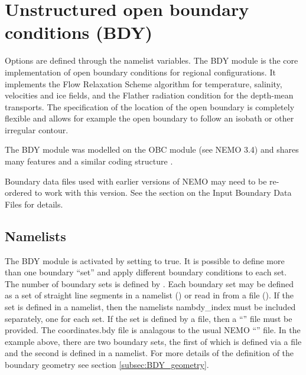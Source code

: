 \documentclass[../tex_main/NEMO_manual]{subfiles}
\begin{document}
\section{Unstructured open boundary conditions (BDY)}
\label{sec:LBC_bdy}




Options are defined through the   namelist variables.
The BDY module is the core implementation of open boundary conditions for regional configurations.
It implements the Flow Relaxation Scheme algorithm for temperature, salinity, velocities and ice fields, and
the Flather radiation condition for the depth-mean transports.
The specification of the location of the open boundary is completely flexible and
allows for example the open boundary to follow an isobath or other irregular contour. 

The BDY module was modelled on the OBC module (see NEMO 3.4) and shares many features and
a similar coding structure \citep{Chanut2005}.

Boundary data files used with earlier versions of NEMO may need to be re-ordered to work with this version.
See the section on the Input Boundary Data Files for details.

\subsection{Namelists}
\label{subsec:BDY_namelist}

The BDY module is activated by setting  to true.
It is possible to define more than one boundary ``set'' and apply different boundary conditions to each set.
The number of boundary sets is defined by .
Each boundary set may be defined as a set of straight line segments in a namelist
() or read in from a file ().
If the set is defined in a namelist, then the namelists nambdy\_index must be included separately, one for each set.
If the set is defined by a file, then a ``'' file must be provided.
The coordinates.bdy file is analagous to the usual NEMO ``'' file.
In the example above, there are two boundary sets, the first of which is defined via a file and
the second is defined in a namelist.
For more details of the definition of the boundary geometry see section \autoref{subsec:BDY_geometry}.
\end{document}
